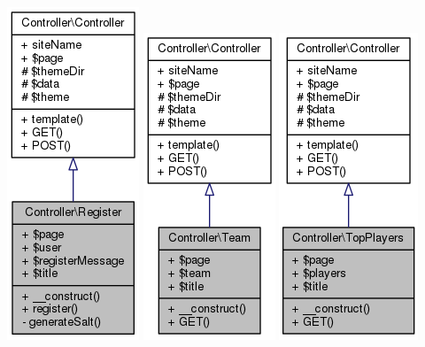 \documentclass[11pt]{article}
\begin{document}
\includegraphics[scale=0.4]{UML_Controller_1_1Register.png}
\includegraphics[scale=0.4]{UML_Controller_1_1Team.png}
\includegraphics[scale=0.4]{UML_Controller_1_1TopPlayers.png}
\end{document}

